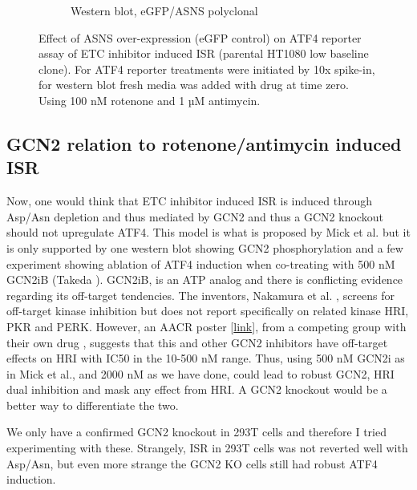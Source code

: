 \begin{figure}[ht]
\begin{subfigure}[b]{0.6\textwidth}
         \caption{Western blot, eGFP/ASNS polyclonal}
         \label{fig:sapp:ISR:HT1080_ISR_ASNS_OE}
     \end{subfigure}
        \caption[ASNS OE, rotenone/antimycin induced ISR.]{
        Effect of ASNS over-expression (eGFP control) on ATF4 reporter assay of ETC inhibitor induced ISR (parental HT1080 low baseline clone).
        For ATF4 reporter treatments were initiated by 10x spike-in, for western blot fresh media was added with drug at time zero.
        Using 100 nM rotenone and 1 µM antimycin.
        }
        \label{fig:sapp:ISR:ASNS_ISR}
\end{figure}







\FloatBarrier
\subsection{GCN2 relation to rotenone/antimycin induced ISR}
Now, one would think that ETC inhibitor induced ISR is induced through Asp/Asn depletion and thus mediated by GCN2 and thus a GCN2 knockout should not upregulate ATF4.
This model is what is proposed by Mick et al. \cite{Mick2020-kf} but it is only supported by one western blot showing GCN2 phosphorylation and a few experiment showing ablation of ATF4 induction when co-treating with 500 nM GCN2iB (Takeda \cite{Nakamura2018-mt}).
GCN2iB, is an ATP analog and there is conflicting evidence regarding its off-target tendencies.
The inventors, Nakamura et al. \cite{Nakamura2018-mt}, screens for off-target kinase inhibition but does not report specifically on related kinase HRI, PKR and PERK.
However, an AACR poster [\href{https://rapt.com/wp-content/uploads/2019/04/FLX-Bio-GCN2-poster-AACR-2019.pdf}{link}], from a competing group with their own drug \cite{Jackson2022-wv}, suggests that this and other GCN2 inhibitors have off-target effects on HRI with IC50 in the 10-500 nM range.
Thus, using 500 nM GCN2i as in Mick et al., and 2000 nM as we have done, could lead to robust GCN2, HRI dual inhibition and mask any effect from HRI.
A GCN2 knockout would be a better way to differentiate the two.

We only have a confirmed GCN2 knockout in 293T cells and therefore I tried experimenting with these.
Strangely, ISR in 293T cells was not reverted well with Asp/Asn, but even more strange the GCN2 KO cells still had robust ATF4 induction.


